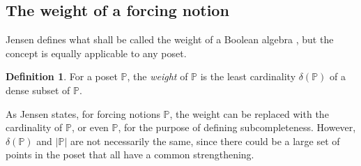 \documentclass{amsart}
\theoremstyle{definition}
\newtheorem{definition}[theorem]{Definition}
\theoremstyle{remark}
\renewcommand{\P}{\mathbb{P}}
\newcommand{\Q}{\mathbb{Q}}
\begin{document}
\subsection{The weight of a forcing notion}
\label{subsec:delta}
Jensen defines what shall be called the weight of a Boolean algebra \cite[Section 3.1 p.~31]{Jensen:2014}, but the concept is equally applicable to any poset.

\begin{definition} For a poset $\P$, the \emph{weight} of \(\P\) is the least cardinality $\delta(\P)$ of a dense subset of $\P$. 
\end{definition}

As Jensen states, for forcing notions $\P$, the weight can be replaced with the cardinality of $\P$, or even $\P$, for the purpose of defining subcompleteness. However, $\delta(\P)$ and $|\P|$ are not necessarily the same, since there could be a large set of points in the poset that all have a common strengthening. 

\end{document}
